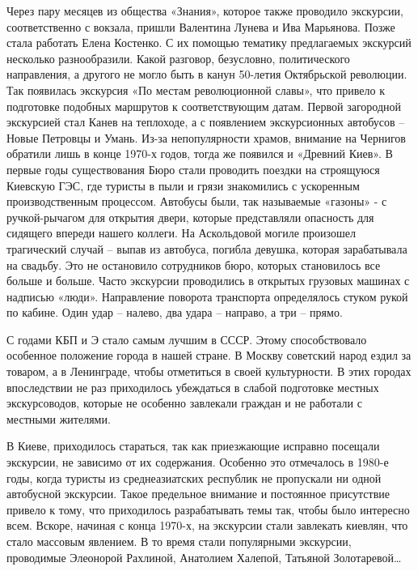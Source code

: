 Через пару месяцев из общества «Знания», которое также проводило экскурсии,
соответственно с вокзала, пришли Валентина Лунева и Ива Марьянова. Позже стала
работать Елена Костенко. С их помощью тематику предлагаемых экскурсий несколько
разнообразили. Какой разговор, безусловно, политического направления, а другого
не могло быть в канун 50-летия Октябрьской революции. Так появилась экскурсия
«По местам революционной славы», что привело к подготовке подобных маршрутов к
соответствующим датам. Первой загородной экскурсией стал Канев на теплоходе, а
с появлением экскурсионных автобусов – Новые Петровцы и Умань. Из-за
непопулярности храмов, внимание на Чернигов обратили лишь в конце 1970-х годов,
тогда же появился и «Древний Киев». В первые годы существования Бюро стали
проводить поездки на строящуюся Киевскую ГЭС, где туристы в пыли и грязи
знакомились с ускоренным производственным процессом. Автобусы были, так
называемые «газоны» - с ручкой-рычагом для открытия двери, которые представляли
опасность для сидящего впереди нашего коллеги. На Аскольдовой могиле произошел
трагический случай – выпав из автобуса, погибла девушка, которая зарабатывала
на свадьбу. Это не остановило сотрудников бюро, которых становилось все больше
и больше. Часто экскурсии проводились в открытых грузовых машинах с надписью
«люди». Направление поворота транспорта определялось стуком рукой по кабине.
Один удар – налево, два удара – направо, а три – прямо.

С годами КБП и Э стало самым лучшим в СССР. Этому способствовало особенное
положение города в нашей стране. В Москву советский народ ездил за товаром, а в
Ленинграде, чтобы отметиться в своей культурности. В этих городах впоследствии
не раз приходилось убеждаться в слабой подготовке местных экскурсоводов,
которые не особенно завлекали граждан и не работали с местными жителями.

В Киеве, приходилось стараться, так как приезжающие исправно посещали
экскурсии, не зависимо от их содержания. Особенно это отмечалось в 1980-е годы,
когда туристы из среднеазиатских республик не пропускали ни одной автобусной
экскурсии. Такое предельное внимание и постоянное присутствие привело к тому,
что приходилось разрабатывать темы так, чтобы было интересно всем. Вскоре,
начиная с конца 1970-х, на экскурсии стали завлекать киевлян, что стало
массовым явлением. В то время стали популярными экскурсии, проводимые Элеонорой
Рахлиной, Анатолием Халепой, Татьяной Золотаревой…

